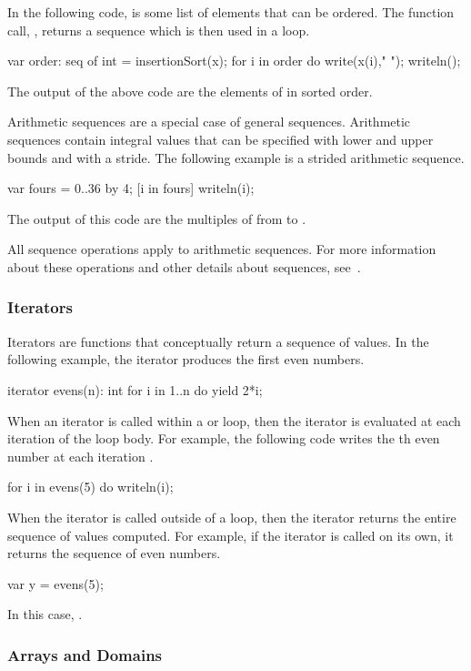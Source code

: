 In the following code,  is some list of elements that can be
ordered.  The function call, , returns a sequence which
is then used in a  loop. 
\begin{chapel}
var order: seq of int = insertionSort(x);
for i in order do write(x(i)," ");
writeln(); 
\end{chapel}
The output of the above code are the elements of  in sorted order.

Arithmetic sequences are a special case of general sequences.  Arithmetic
sequences contain integral values that can be specified with lower and upper
bounds and with a stride.  The following example is a strided arithmetic sequence.
\begin{chapel}
var fours = 0..36 by 4;
[i in fours] writeln(i);
\end{chapel}
The output of this code are the multiples of  from  to
.

All sequence operations apply to arithmetic sequences.  For more information
about these operations and other details about sequences, see~.

\subsubsection{Iterators}
\label{Intro_Iterators}

Iterators are functions that conceptually return a sequence of values.
In the following example, the iterator produces the first  even
numbers.  
\begin{chapel}
iterator evens(n): int {
  for i in 1..n do yield 2*i;
}
\end{chapel}
When an iterator is called within a  or  loop,
then the iterator is evaluated at each iteration of the loop body.
For example, the following code writes the th even number at 
each iteration .
\begin{chapel}
for i in evens(5) do writeln(i);
\end{chapel}
When the iterator is called outside of a loop, then the iterator returns
the entire sequence of values computed.  For example, if the  iterator
is called on its own, it returns the sequence of  even numbers.
\begin{chapel}
var y = evens(5);
\end{chapel}
In this case, .

\subsubsection{Arrays and Domains}
\label{Arrays_and_Domains}

